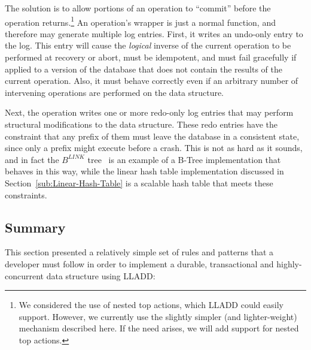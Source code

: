 \documentclass[letterpaper,english]{article}
\begin{document}
\begin{enumerate}
\begin{enumerate}
\begin{enumerate}
The solution is to allow portions of an operation to ``commit'' before
the operation returns.\footnote{We considered the use of nested top actions, which LLADD could easily
support. However, we currently use the slightly simpler (and lighter-weight)
mechanism described here. If the need arises, we will add support
for nested top actions.}
An operation's wrapper is just a normal function, and therefore may
generate multiple log entries. First, it writes an undo-only entry
to the log. This entry will cause the \emph{logical} inverse of the
current operation to be performed at recovery or abort, must be idempotent,
and must fail gracefully if applied to a version of the database that
does not contain the results of the current operation. Also, it must
behave correctly even if an arbitrary number of intervening operations
are performed on the data structure.

Next, the operation writes one or more redo-only log entries that may perform structural
modifications to the data structure. These redo entries have the constraint that any prefix of them must leave the database in a consistent state, since only a prefix might execute before a crash.  This is not as hard as it sounds, and in fact the
$B^{LINK}$ tree~\cite{blink} is an example of a B-Tree implementation
that behaves in this way, while the linear hash table implementation
discussed in Section~\ref{sub:Linear-Hash-Table} is a scalable 
hash table that meets these constraints.


\subsection{Summary}

This section presented a relatively simple set of rules and patterns
that a developer must follow in order to implement a durable, transactional
and highly-concurrent data structure using LLADD:


\end{enumerate}
\end{enumerate}
\end{enumerate}
\end{document}

